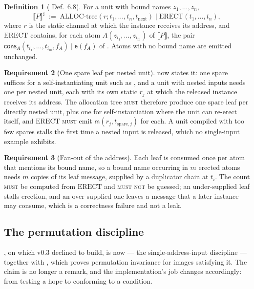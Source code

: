 \documentclass[11pt,a4paper]{article}
\newcommand{\MUST}{\textsc{must}}
\newcommand{\MUSTNOT}{\textsc{must not}}
\newcommand{\enc}[1]{\llbracket #1 \rrbracket}
\newcommand{\mm}{\mathsf{m}}
\newcommand{\ev}{\mathsf{e}}
\newcommand{\cons}{\mathsf{cons}}
\newcommand{\ERECT}{\mathrm{ERECT}}
\theoremstyle{definition}
\newtheorem{definition}{Definition}[section]
\newtheorem{requirement}[definition]{Requirement}
\theoremstyle{plain}
\begin{document}
\begin{definition}[\cite{draft3} Def.~6.8]\label{def:phase2}
For a unit with bound names $z_{1},\dots,z_{n}$,
\[
  \enc{P}^{\sharp} \;:=\;
  \text{ALLOC-tree}(r; t_{1},\dots,t_{n},t_{\mathrm{next}})
  \mid \ERECT(t_{1},\dots,t_{n}),
\]
where $r$ is the static channel at which the instance receives its address,
and $\ERECT$ contains, for each atom $A(z_{i_{1}},\dots,z_{i_{m}})$ of
$\enc{P}$, the pair $\cons_{A}(t_{i_{1}},\dots,t_{i_{m}},f_{A}) \mid \ev(f_{A})$
of \cite[Rem.~3.11]{draft3}. Atoms with no bound name are emitted unchanged.
\end{definition}

\begin{requirement}[One spare leaf per nested unit]\label{req:spares}
\cite[Rem.~6.13]{draft3} now states it: one spare suffices for a
self-instantiating unit such as \cite[Ex.~6.9]{draft3}, and a unit with nested
inputs needs one per nested unit, each with its own static $r_{j}$ at which
the released instance receives its address. The allocation tree \MUST{} therefore produce one spare leaf per
directly nested unit, plus one for self-instantiation where the unit can
re-erect itself, and $\ERECT$ \MUST{} emit $\mm(r_{j}, t_{\mathrm{spare},j})$
for each. A unit compiled with too few spares stalls the first time a nested
input is released, which no single-input example exhibits.
\end{requirement}

\begin{requirement}[Fan-out of the address]\label{req:fanout}
Each leaf is consumed once per atom that mentions its bound name, so a bound
name occurring in $m$ erected atoms needs $m$ copies of its leaf message,
supplied by a duplicator chain at $t_{i}$. The count \MUST{} be computed from
$\ERECT$ and \MUSTNOT{} be guessed; an under-supplied leaf stalls erection,
and an over-supplied one leaves a message that a later instance may consume,
which is a correctness failure and not a leak.
\end{requirement}

\subsection{The permutation discipline}\label{sec:discipline}

\cite[Rem.~6.10]{draft3}, on which v0.3 declined to build, is now
\cite[Def.~6.10]{draft3} --- the single-address-input discipline --- together
with \cite[Lem.~6.11]{draft3}, which proves permutation invariance for images
satisfying it. The claim is no longer a remark, and the implementation's job
changes accordingly: from testing a hope to conforming to a condition.
\end{document}
